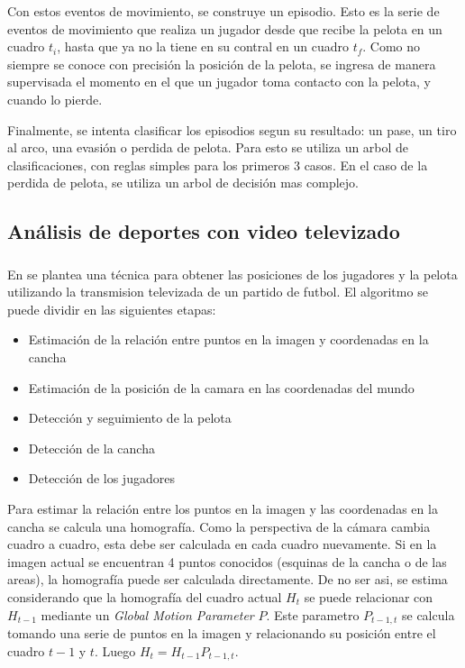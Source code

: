 \documentclass[a4paper,10pt]{article}
\begin{document}
Con estos eventos de movimiento, se construye un episodio. Esto es la serie de eventos de movimiento que realiza
un jugador desde que recibe la pelota en un cuadro $t_i$, hasta que ya no la tiene en su contral en un cuadro $t_f$.
Como no siempre se conoce con precisión la posición de la pelota, se ingresa de manera supervisada el momento en el
que un jugador toma contacto con la pelota, y cuando lo pierde.

Finalmente, se intenta clasificar los episodios segun su resultado: un pase, un tiro al arco, una evasión o perdida de pelota.
Para esto se utiliza un arbol de clasificaciones, con reglas simples para los primeros 3 casos.
En el caso de la perdida de pelota, se utiliza un arbol de decisión mas complejo.

\subsection{Análisis de deportes con video televizado}
\label{sec:tv-video}

\subsubsection{}

En \cite{LIU20061146} se plantea una técnica para obtener las posiciones de los
jugadores y la pelota utilizando la transmision televizada de un partido de
futbol. El algoritmo se puede dividir en las siguientes etapas:

\begin{itemize}
  \item Estimación de la relación entre puntos en la imagen y coordenadas en la cancha
  \item Estimación de la posición de la camara en las coordenadas del mundo
  \item Detección y seguimiento de la pelota
  \item Detección de la cancha
  \item Detección de los jugadores
\end{itemize}

Para estimar la relación entre los puntos en la imagen y las coordenadas en la cancha se calcula una homografía.
Como la perspectiva de la cámara cambia cuadro a cuadro, esta debe ser calculada en cada cuadro nuevamente.
Si en la imagen actual se encuentran 4 puntos conocidos (esquinas de la cancha o de las areas), la homografía puede ser calculada directamente.
De no ser asi, se estima considerando que la homografía del cuadro actual $H_t$ se puede relacionar con $H_{t-1}$ mediante un \textit{Global Motion Parameter} $P$.
Este parametro $P_{t-1,t}$ se calcula tomando una serie de puntos en la imagen y relacionando su posición entre el cuadro $t-1$ y $t$.
Luego $ H_t = H_{t-1} P_{t-1,t}$.
\end{document}
